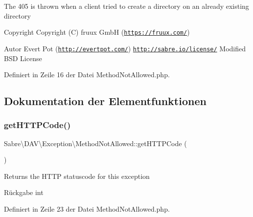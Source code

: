 The 405 is thrown when a client tried to create a directory on an already existing directory

\begin{DoxyCopyright}{Copyright}
Copyright (C) fruux GmbH (\href{https://fruux.com/}{\tt https\+://fruux.\+com/}) 
\end{DoxyCopyright}
\begin{DoxyAuthor}{Autor}
Evert Pot (\href{http://evertpot.com/}{\tt http\+://evertpot.\+com/})  \href{http://sabre.io/license/}{\tt http\+://sabre.\+io/license/} Modified B\+SD License 
\end{DoxyAuthor}


Definiert in Zeile 16 der Datei Method\+Not\+Allowed.\+php.



\subsection{Dokumentation der Elementfunktionen}
\mbox{\label{class_sabre_1_1_d_a_v_1_1_exception_1_1_method_not_allowed_abe1309963dbb7079d97afae46bd58a8f}} 
\subsubsection{\texorpdfstring{get\+H\+T\+T\+P\+Code()}{getHTTPCode()}}
{\footnotesize\ttfamily Sabre\textbackslash{}\+D\+A\+V\textbackslash{}\+Exception\textbackslash{}\+Method\+Not\+Allowed\+::get\+H\+T\+T\+P\+Code (\begin{DoxyParamCaption}{ }\end{DoxyParamCaption})}

Returns the H\+T\+TP statuscode for this exception

\begin{DoxyReturn}{Rückgabe}
int 
\end{DoxyReturn}


Definiert in Zeile 23 der Datei Method\+Not\+Allowed.\+php.

\mbox{\label{class_sabre_1_1_d_a_v_1_1_exception_1_1_method_not_allowed_aafbe8aba4665eac1c1784829e522eab8}} 
